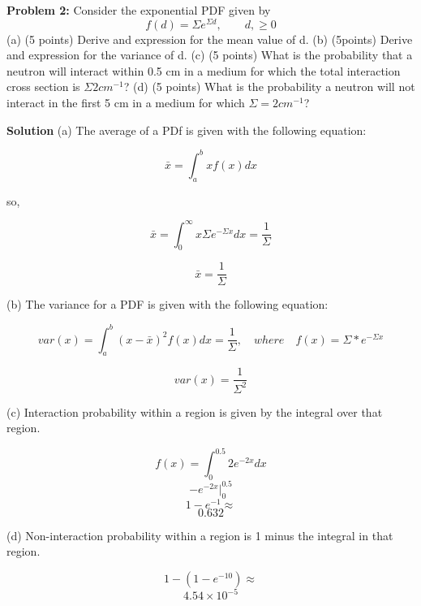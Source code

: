 \documentclass{amsart}
\theoremstyle{definition}
\begin{document}
 
\newpage
\textbf{Problem 2:} Consider the exponential PDF given by
\begin{equation*}
    f(d) = \Sigma e^{\Sigma d}, \qquad d,\geq 0
\end{equation*}
(a) (5 points) Derive and expression for the mean value of d. \newline
(b) (5points) Derive and expression for the variance of d. \newline
(c) (5 points) What is the probability that a neutron will interact within 0.5 cm in a medium for which the total interaction cross section is $\Sigma 2 cm^{-1}$? \newline
(d) (5 points) What is the probability a neutron will not interact in the first 5 cm in a medium for which $\Sigma = 2 cm^{-1}$? \newline


\textbf{Solution}
\bigbreak
(a) 
The average of a PDf is given with the following equation:

$$ \bar{x} = \int_a^b x f(x) dx $$

so,

$$ \bar{x} = \int_{0}^{\infty}{x\Sigma e^{-\Sigma x}dx} = \frac{1}{\Sigma} $$

$$ \boxed{ \bar{x} = \frac{1}{\Sigma}} $$


(b)
The variance for a PDF is given with the following equation:

$$ var(x) = \int_{a}^{b}{(x-\bar{x})^2f(x)dx} = \frac{1}{\Sigma}, \quad where \quad f(x) = \Sigma*e^{-\Sigma x} $$

$$ \boxed{ var(x) = \frac{1}{\Sigma^2}} $$


(c) 
Interaction probability within a region is given by the integral over that region.

$$ f(x) = \int_0^{0.5} 2 e^{-2x}dx $$
$$ -e^{-2x} |^{0.5}_0 $$
$$ 1 - e^{-1} \approx $$
$$ \boxed{0.632} $$


(d)
Non-interaction probability within a region is 1 minus the integral in that region.

$$ 1 - (1 - e^{-10}) \approx $$
$$ \boxed{4.54 \times 10^{-5}} $$
\end{document}
